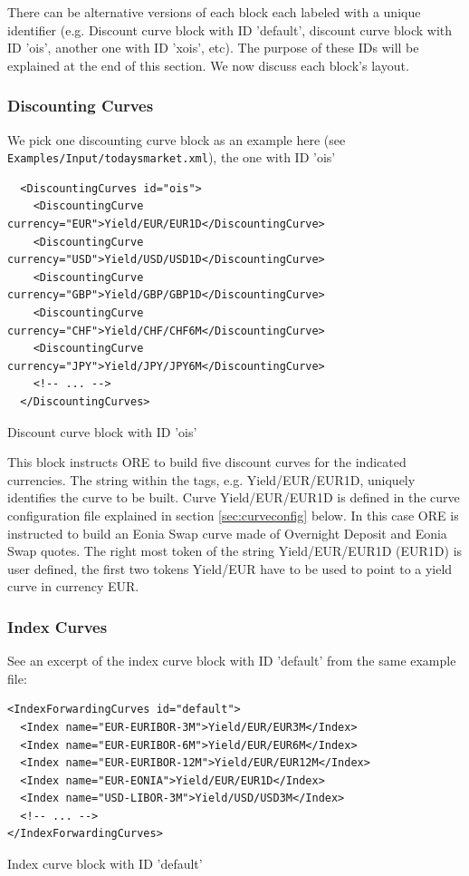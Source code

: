 \documentclass[12pt, a4paper]{article}
\begin{document}
There can be alternative versions of each block each labeled with a unique identifier (e.g. Discount curve block with ID
'default', discount curve block with ID 'ois', another one with ID 'xois', etc). The purpose of these IDs will be
explained at the end of this section. We now discuss each block's layout.

\subsubsection{Discounting Curves} 

We pick one discounting curve block as an example here (see {\tt Examples/Input/todaysmarket.xml}), the one with ID 'ois' 

\begin{listing}[H]
\begin{verbatim}
  <DiscountingCurves id="ois">
    <DiscountingCurve currency="EUR">Yield/EUR/EUR1D</DiscountingCurve>
    <DiscountingCurve currency="USD">Yield/USD/USD1D</DiscountingCurve>
    <DiscountingCurve currency="GBP">Yield/GBP/GBP1D</DiscountingCurve>
    <DiscountingCurve currency="CHF">Yield/CHF/CHF6M</DiscountingCurve>
    <DiscountingCurve currency="JPY">Yield/JPY/JPY6M</DiscountingCurve>
    <!-- ... -->
  </DiscountingCurves>
\end{verbatim}
\caption{Discount curve block with ID 'ois'}
\label{lst:discountcurve_spec}
\end{listing}

This block instructs ORE to build five discount curves for the indicated currencies. The string within the tags,
e.g. Yield/EUR/EUR1D, uniquely identifies the curve to be built.  Curve Yield/EUR/EUR1D is defined in the curve
configuration file explained in section \ref{sec:curveconfig} below. In this case ORE is instructed to build an Eonia
Swap curve made of Overnight Deposit and Eonia Swap quotes. The right most token of the string Yield/EUR/EUR1D (EUR1D)
is user defined, the first two tokens Yield/EUR have to be used to point to a yield curve in currency EUR.
 
\subsubsection{Index Curves} 

See an excerpt of the index curve block with ID 'default' from the same example file:

\begin{listing}[H]
\begin{verbatim}
<IndexForwardingCurves id="default">
  <Index name="EUR-EURIBOR-3M">Yield/EUR/EUR3M</Index>
  <Index name="EUR-EURIBOR-6M">Yield/EUR/EUR6M</Index>
  <Index name="EUR-EURIBOR-12M">Yield/EUR/EUR12M</Index>
  <Index name="EUR-EONIA">Yield/EUR/EUR1D</Index>
  <Index name="USD-LIBOR-3M">Yield/USD/USD3M</Index>
  <!-- ... -->
</IndexForwardingCurves>
\end{verbatim}
\caption{Index curve block with ID 'default'}
\label{lst:indexcurve_spec}
\end{listing}
\end{document}

